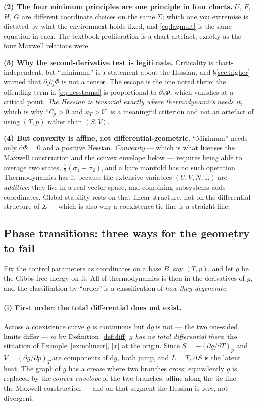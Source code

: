 \documentclass[10pt,a4paper]{article}
\newcommand{\dd}{\mathrm{d}}
\theoremstyle{plain}
\theoremstyle{definition}
\numberwithin{equation}{section}
\begin{document}
\textbf{(2) The four minimum principles are one principle in four charts.} $U$, $F$, $H$, $G$
are different coordinate choices on the same $\Sigma$; which one you extremise is dictated by
what the environment holds fixed, and \eqref{eq:lagmult} is the same equation in each. The
textbook proliferation is a chart artefact, exactly as the four Maxwell relations were.

\textbf{(3) Why the second-derivative test is legitimate.} Criticality is chart-independent,
but ``minimum'' is a statement about the Hessian, and \S\ref{sec:higher} warned that
$\partial_i\partial_j\Phi$ is not a tensor. The escape is the one noted there: the offending
term in \eqref{eq:hesstransf} is proportional to $\partial_k\Phi$, which vanishes at a critical
point. \emph{The Hessian is tensorial exactly where thermodynamics needs it}, which is why
``$C_p>0$ and $\kappa_T>0$'' is a meaningful criterion and not an artefact of using $(T,p)$
rather than $(S,V)$.

\textbf{(4) But convexity is affine, not differential-geometric.} ``Minimum'' needs only
$\dd\Phi=0$ and a positive Hessian. \emph{Convexity} --- which is what licenses the Maxwell
construction and the convex envelope below --- requires being able to average two states,
$\tfrac12(\sigma_1+\sigma_2)$, and a bare manifold has no such operation. Thermodynamics has it
because the extensive variables $(U,V,N,\dots)$ are \emph{additive}: they live in a real vector
space, and combining subsystems adds coordinates. Global stability rests on that linear
structure, not on the differential structure of $\Sigma$ --- which is also why a coexistence tie
line is a straight line.

\subsection{Phase transitions: three ways for the geometry to fail}
\label{sec:phasetrans}

Fix the control parameters as coordinates on a base $B$, say $(T,p)$, and let $g$ be the Gibbs
free energy on it. All of thermodynamics is then in the derivatives of $g$, and the
classification by ``order'' is a classification of \emph{how they degenerate}.

\paragraph{(i) First order: the total differential does not exist.} Across a coexistence curve
$g$ is continuous but $\dd g$ is not --- the two one-sided limits differ --- so by
Definition~\ref{def:diff} \emph{$g$ has no total differential there}: the situation of
Example~\ref{ex:nolinear}, $|x|$ at the origin. Since $S=-(\partial g/\partial T)_p$ and
$V=(\partial g/\partial p)_T$ are components of $\dd g$, both jump, and $L=T_c\Delta S$ is the
latent heat. The graph of $g$ has a crease where two branches cross; equivalently $g$ is
replaced by the \emph{convex envelope} of the two branches, affine along the tie line --- the
Maxwell construction --- and on that segment the Hessian is \emph{zero}, not divergent.
\end{document}
